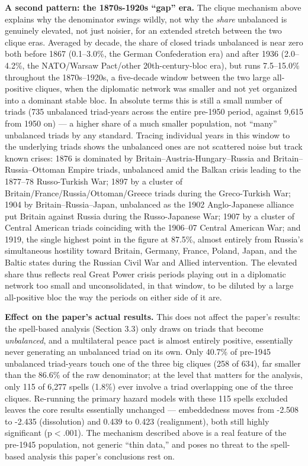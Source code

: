 \documentclass[Afour,sageh,times,doublespace]{sagej}
\begin{document}
\textbf{A second pattern: the 1870s-1920s ``gap'' era.} The clique mechanism above explains why the denominator swings wildly, not why the \emph{share} unbalanced is genuinely elevated, not just noisier, for an extended stretch between the two clique eras. Averaged by decade, the share of closed triads unbalanced is near zero both before 1867 (0.1--3.0\%, the German Confederation era) and after 1936 (2.0--4.2\%, the NATO/Warsaw Pact/other 20th-century-bloc era), but runs 7.5--15.0\% throughout the 1870s--1920s, a five-decade window between the two large all-positive cliques, when the diplomatic network was smaller and not yet organized into a dominant stable bloc. In absolute terms this is still a small number of triads (735 unbalanced triad-years across the entire pre-1950 period, against 9,615 from 1950 on) --- a higher share of a much smaller population, not ``many'' unbalanced triads by any standard. Tracing individual years in this window to the underlying triads shows the unbalanced ones are not scattered noise but track known crises: 1876 is dominated by Britain--Austria-Hungary--Russia and Britain--Russia--Ottoman Empire triads, unbalanced amid the Balkan crisis leading to the 1877--78 Russo-Turkish War; 1897 by a cluster of Britain/France/Russia/Ottoman/Greece triads during the Greco-Turkish War; 1904 by Britain--Russia--Japan, unbalanced as the 1902 Anglo-Japanese alliance put Britain against Russia during the Russo-Japanese War; 1907 by a cluster of Central American triads coinciding with the 1906--07 Central American War; and 1919, the single highest point in the figure at 87.5\%, almost entirely from Russia's simultaneous hostility toward Britain, Germany, France, Poland, Japan, and the Baltic states during the Russian Civil War and Allied intervention. The elevated share thus reflects real Great Power crisis periods playing out in a diplomatic network too small and unconsolidated, in that window, to be diluted by a large all-positive bloc the way the periods on either side of it are.

\textbf{Effect on the paper's actual results.} This does not affect the paper's results: the spell-based analysis (Section 3.3) only draws on triads that become \emph{unbalanced}, and a multilateral peace pact is almost entirely positive, essentially never generating an unbalanced triad on its own. Only 40.7\% of pre-1945 unbalanced triad-years touch one of the three big cliques (258 of 634), far smaller than the 86.6\% of the raw denominator; at the level that matters for the analysis, only 115 of 6,277 spells (1.8\%) ever involve a triad overlapping one of the three cliques. Re-running the primary hazard models with these 115 spells excluded leaves the core results essentially unchanged --- embeddedness moves from -2.508 to -2.435 (dissolution) and 0.439 to 0.423 (realignment), both still highly significant (p$<$.001). The mechanism described above is a real feature of the pre-1945 population, not generic ``thin data,'' and poses no threat to the spell-based analysis this paper's conclusions rest on.
\end{document}

